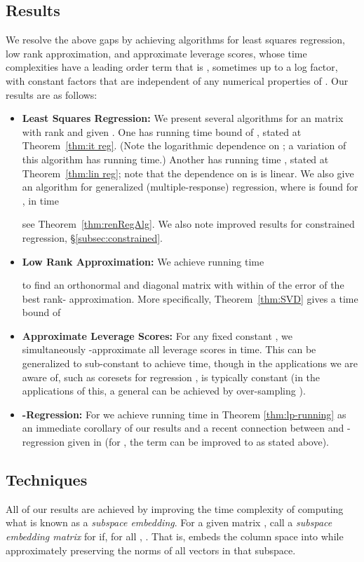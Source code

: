 \documentclass{sig-alternate}
\begin{document}
\subsection{Results}
We resolve the above gaps by achieving algorithms
for least squares regression, low rank approximation,
and approximate leverage scores, whose time complexities have 
a leading order term that is
, sometimes up to a log factor,
with constant factors that are independent of any numerical properties of .
Our results are as follows:
\begin{itemize}
\item {\bf Least Squares Regression:} We present several algorithms 
for an  matrix  with rank  and given
. One 
has running time bound of
,
stated at Theorem~\ref{thm:it reg}. (Note the logarithmic dependence on ;
a variation of this algorithm has 
running time.)
Another has 
running time , stated at
Theorem~\ref{thm:lin reg}; note that the dependence on  is
is linear.
We also give an algorithm for generalized (multiple-response)
regression, where  is found for ,
in time 

see Theorem~\ref{thm:renRegAlg}.
We also note improved results for constrained regression,
\S\ref{subsec:constrained}.
\item {\bf Low Rank Approximation:}
We achieve running time

to find an orthonormal  and diagonal  matrix
with  within  of the error of the best rank-
approximation. More specifically,
Theorem~\ref{thm:SVD} gives a time bound
of

\item {\bf Approximate Leverage Scores:} For any fixed constant , we simultaneously
-approximate all  leverage scores in 
 time. 
This can be generalized to sub-constant  to achieve  time, 
though in the applications we are aware of, such
as coresets for regression \cite{ddhkm09},  is typically constant 
(in the applications of this, a general  can be achieved
by over-sampling \cite{dmm06,ddhkm09}).
\item {\bf -Regression:}
For 
we achieve
running time 
in 
Theorem \ref{thm:lp-running} as an immediate corollary of our results and a recent connection between 
 and -regression given in \cite{CDMMMW}
(for , the  term can be improved to  as 
stated above).
\end{itemize}
\subsection{Techniques}
All of our results are achieved by improving the time complexity of computing what is known 
as a {\it subspace embedding}. For a given  matrix , call 
a \emph{subspace embedding matrix} for  if, for all , .
That is,  embeds the column space  into 
while approximately preserving the norms of all vectors in that subspace.
\end{document}

